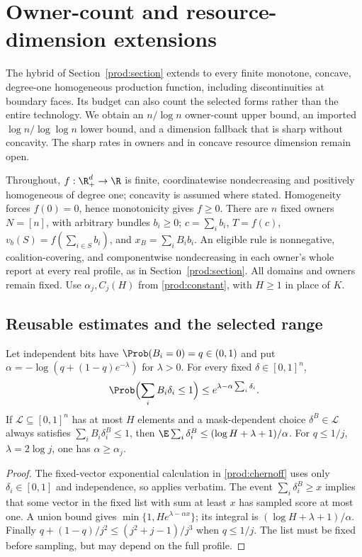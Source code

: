 \section{Owner-count and resource-dimension extensions}\label{ext:sec}
The hybrid of Section~\ref{prod:section} extends to every finite monotone,
concave, degree-one homogeneous production function, including discontinuities
at boundary faces.  Its budget can also count the selected forms rather than
the entire technology.  We obtain an $n/\log n$ owner-count upper bound,
an imported $\log n/\log\log n$ lower bound, and a dimension fallback that is
sharp without concavity.  The sharp rates in owners and in concave resource
dimension remain open.

Throughout, $f:\R_+^d\to\R$ is finite, coordinatewise nondecreasing and
positively homogeneous of degree one; concavity is assumed where stated.
Homogeneity forces $f(0)=0$, hence monotonicity gives $f\ge0$.
There are $n$ fixed owners $N=[n]$, with arbitrary bundles $b_i\ge0$;
$c=\sum_i b_i$, $T=f(c)$, $v_b(S)=f(\sum_{i\in S}b_i)$, and
$x_B=\sum_iB_i b_i$.  An eligible rule is nonnegative, coalition-covering,
and componentwise nondecreasing in each owner's whole report at every real
profile, as in Section~\ref{prod:section}.  All domains and owners remain fixed.
Use $\alpha_j,C_j(H)$ from \eqref{prod:constant}, with $H\ge1$ in place of $K$.

\subsection{Reusable estimates and the selected range}
\begin{lemma}\label{ext:lem:chernoff}
Let independent bits have $\Prob(B_i=0)=q\in(0,1)$ and put
$\alpha=-\log(q+(1-q)e^{-\lambda})$ for $\lambda>0$.
For every fixed $\delta\in[0,1]^n$,
\[
 \Prob\Bigl(\sum_iB_i\delta_i\le1\Bigr)
 \le e^{\lambda-\alpha\sum_i\delta_i}.
\]
If $\mathcal L\subseteq[0,1]^n$ has at most $H$ elements and a mask-dependent
choice $\delta^B\in\mathcal L$ always satisfies
$\sum_iB_i\delta_i^B\le1$, then
$\E\sum_i\delta_i^B\le(\log H+\lambda+1)/\alpha$.
For $q\le1/j$, $\lambda=2\log j$, one has $\alpha\ge\alpha_j$.
\end{lemma}
\begin{proof}
The fixed-vector exponential calculation in \eqref{prod:chernoff} uses only
$\delta_i\in[0,1]$ and independence, so applies verbatim.
The event $\sum_i\delta_i^B\ge x$ implies that some vector in the fixed
list with sum at least $x$ has sampled score at most one.
A union bound gives $\min\{1,He^{\lambda-\alpha x}\}$; its integral is
$(\log H+\lambda+1)/\alpha$.  Finally
$q+(1-q)/j^2\le(j^2+j-1)/j^3$ when $q\le1/j$.
The list must be fixed before sampling, but may depend on the full profile.
\end{proof}


